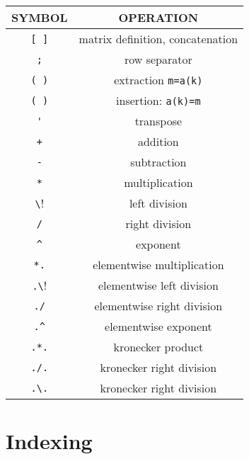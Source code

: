 \begin{center}
\begin{tabular}{|c|c|}
\hline
SYMBOL & OPERATION 
\\ \hline \hline
\verb![ ]! & matrix definition, concatenation\\ \hline

\verb!;! & row separator\\ \hline

\verb!( )! & extraction \verb!m=a(k)! \\ \hline

\verb!( )! & insertion:  \verb!a(k)=m!  \\ \hline

\verb!'! & transpose \\ \hline

\verb!+! & addition  \\ \hline

\verb!-! & subtraction \\ \hline

\verb!*! & multiplication \\ \hline

\verb!\! & left division \\ \hline

\verb!/! & right division \\ \hline

\verb!^! &  exponent \\ \hline

\verb!*.! & elementwise multiplication  \\ \hline

\verb!.\! &  elementwise left division  \\ \hline

\verb!./! &  elementwise right division  \\ \hline

\verb!.^! &  elementwise exponent  \\ \hline

\verb!.*.! & kronecker product \\ \hline

\verb!./.! & kronecker right division \\ \hline

\verb!.\.! &  kronecker right division \\ \hline  
\end{tabular}
\end{center}

\section{Indexing}

